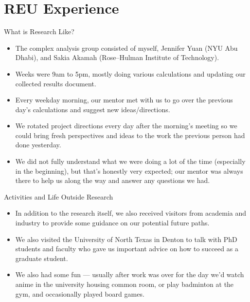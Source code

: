 \documentclass{reu_beamer}
\begin{document}
\section{REU Experience}
\begin{frame}{What is Research Like?}
  \begin{itemize}
    \item The complex analysis group consisted of myself, Jennifer Yuan (NYU Abu Dhabi), and Sakia Akamah (Rose--Hulman Institute of Technology).
    \item Weeks were 9am to 5pm, mostly doing various calculations and updating our collected results document.
    \item Every weekday morning, our mentor met with us to go over the previous day's calculations and suggest new ideas/directions.
    \item We rotated project directions every day after the morning's meeting so we could bring fresh perspectives and ideas to the work the previous person had done yesterday.
    \item We did not fully understand what we were doing a lot of the time (especially in the beginning), but that's honestly very expected; our mentor was always there to help us along the way and answer any questions we had.
  \end{itemize}
\end{frame}
\begin{frame}{Activities and Life Outside Research}
  \begin{itemize}
    \item In addition to the research itself, we also received visitors from academia and industry to provide some guidance on our potential future paths.
    \item We also visited the University of North Texas in Denton to talk with PhD students and faculty who gave us important advice on how to succeed as a graduate student.
    \item We also had some fun --- usually after work was over for the day we'd watch anime in the university housing common room, or play badminton at the gym, and occasionally played board games.
  \end{itemize}
\end{frame}
\end{document}

